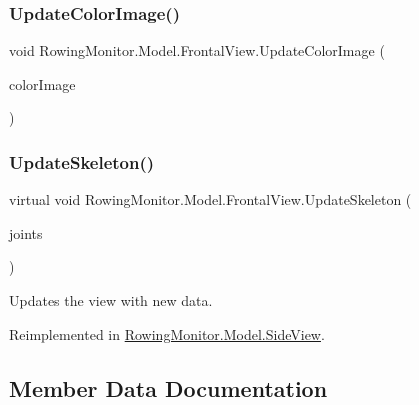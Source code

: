 \subsubsection{\texorpdfstring{Update\+Color\+Image()}{UpdateColorImage()}}
{\footnotesize\ttfamily void Rowing\+Monitor.\+Model.\+Frontal\+View.\+Update\+Color\+Image (\begin{DoxyParamCaption}\item[{Writeable\+Bitmap}]{color\+Image }\end{DoxyParamCaption})}

\mbox{\label{class_rowing_monitor_1_1_model_1_1_frontal_view_a3dddfa75ba346fdcf99dbd763e9ea1ea}} 
\subsubsection{\texorpdfstring{Update\+Skeleton()}{UpdateSkeleton()}}
{\footnotesize\ttfamily virtual void Rowing\+Monitor.\+Model.\+Frontal\+View.\+Update\+Skeleton (\begin{DoxyParamCaption}\item[{I\+Read\+Only\+Dictionary$<$ Joint\+Type, Joint $>$}]{joints }\end{DoxyParamCaption})\hspace{0.3cm}{\ttfamily [virtual]}}



Updates the view with new data. 



Reimplemented in \hyperlink{class_rowing_monitor_1_1_model_1_1_side_view_a2cfba6b08a666c71ed25a3cbeaabe138}{Rowing\+Monitor.\+Model.\+Side\+View}.



\subsection{Member Data Documentation}
\mbox{\label{class_rowing_monitor_1_1_model_1_1_frontal_view_a75389fa61ab8d54d93aadc11d5d5360e}} 
